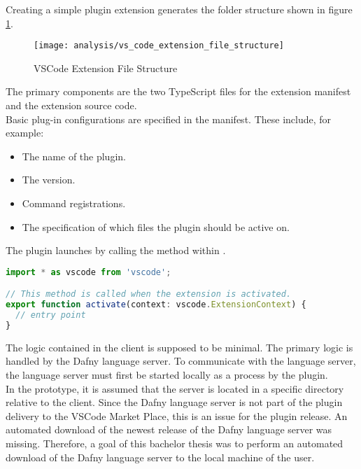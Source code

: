Creating a simple plugin extension generates the folder structure shown in figure \ref{fig:vs_code_extension_file_structure}.

\begin{figure}[H]
    \centering
    \texttt{[image: analysis/vs\_code\_extension\_file\_structure]}
    \caption{VSCode Extension File Structure}
    \label{fig:vs_code_extension_file_structure}
\end{figure}

The primary components are the two TypeScript files for the extension manifest and the extension source code. \\

Basic plug-in configurations are specified in the manifest.
These include, for example:
\begin{itemize}
    \item The name of the plugin.
    \item The version.
    \item Command registrations.
    \item The specification of which files the plugin should be active on.
\end{itemize}

The plugin launches by calling the method  within .

\begin{lstlisting}[language=typescript, caption={extension.ts}, captionpos=b, label={lst:extension-file}]
import * as vscode from 'vscode';

// This method is called when the extension is activated.
export function activate(context: vscode.ExtensionContext) {
  // entry point
}
\end{lstlisting}

The logic contained in the client is supposed to be minimal.
The primary logic is handled by the Dafny language server.
To communicate with the language server, the language server must first be started locally as a process by the plugin. \\

In the prototype, it is assumed that the server is located in a specific directory relative to the client.
Since the Dafny language server is not part of the plugin delivery to the VSCode Market Place,
this is an issue for the plugin release.
An automated download of the newest release of the Dafny language server was missing.
Therefore, a goal of this bachelor thesis was to perform an automated download of the Dafny language server to the local machine of the user.

